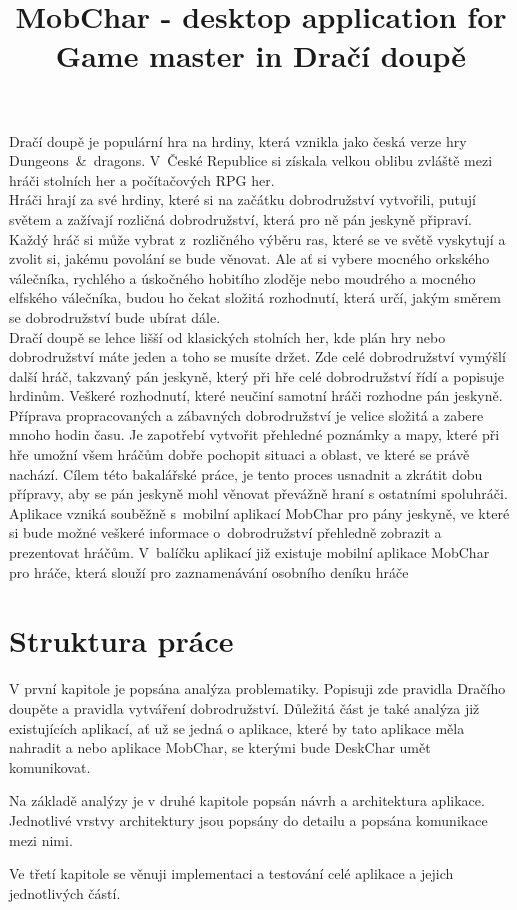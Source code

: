 \documentclass[thesis=B,czech]{resources/FITthesis}[2012/06/26]
\title{	MobChar - desktop application for Game master in Dračí doupě}
\begin{document}

\begin{introduction}
Dračí doupě je populární hra na hrdiny, která vznikla jako česká verze hry Dungeons~\&~dragons. V~České Republice si získala velkou oblibu zvláště mezi hráči stolních her a počítačových RPG her.\\

Hráči hrají za své hrdiny, které si na začátku dobrodružství vytvořili, putují světem a zažívají 			rozličná dobrodružství, která pro ně pán jeskyně připraví. Každý hráč si může vybrat z~rozličného 			výběru 	ras, které se ve světě vyskytují a zvolit si, jakému povolání se bude věnovat. Ale ať si 			vybere mocného orkského válečníka, rychlého a úskočného hobitího zloděje nebo moudrého a mocného 			elfského válečníka, budou ho čekat složitá rozhodnutí, která určí, jakým směrem se dobrodružství 			bude ubírat dále. \\

Dračí doupě se lehce lišší od klasických stolních her, kde plán hry nebo dobrodružství máte jeden a 		toho se musíte držet. Zde celé dobrodružství vymýšlí další hráč, takzvaný pán jeskyně, který při hře 	celé dobrodružství řídí a popisuje hrdinům. Veškeré rozhodnutí, které neučiní samotní hráči rozhodne 	pán jeskyně. Příprava propracovaných a zábavných dobrodružství je velice složitá a zabere mnoho 			hodin času. Je zapotřebí vytvořit přehledné poznámky a mapy, které při hře umožní všem hráčům dobře 		pochopit situaci a oblast, ve které se právě nachází. Cílem této bakalářské práce, je tento proces 			usnadnit a zkrátit dobu přípravy, aby se pán jeskyně mohl věnovat převážně hraní s ostatními 				spoluhráči. \\

Aplikace vzniká souběžně s~mobilní aplikací MobChar pro pány jeskyně, ve které si bude možné veškeré 	informace o~dobrodružství přehledně zobrazit a prezentovat hráčům. V~balíčku aplikací již existuje 			mobilní aplikace MobChar pro hráče, která slouží pro zaznamenávání osobního deníku hráče \\


\section*{Struktura práce}
V první kapitole je popsána analýza problematiky. Popisuji zde pravidla Dračího doupěte a pravidla 			vytváření dobrodružství. Důležitá část je také analýza již existujících aplikací, ať už se jedná o 			aplikace, které by tato aplikace měla nahradit a nebo aplikace MobChar, se kterými bude DeskChar			umět komunikovat.

Na základě analýzy je v druhé kapitole popsán návrh a architektura aplikace. Jednotlivé vrstvy architektury jsou popsány do detailu a popsána komunikace mezi nimi.

Ve třetí kapitole se věnuji implementaci a testování celé aplikace a jejich jednotlivých částí.


\end{introduction}
\end{document}
